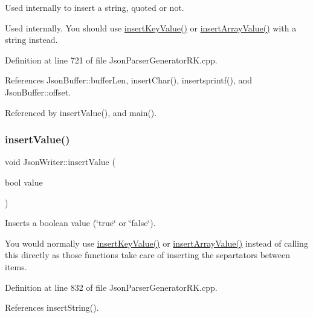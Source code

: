 Used internally to insert a string, quoted or not. 

Used internally. You should use \hyperlink{class_json_writer_ac2de627389b59ce2c8ed95e10ea213bf}{insert\+Key\+Value()} or \hyperlink{class_json_writer_a8b4dc6726b66b4f277c7674e60c8a057}{insert\+Array\+Value()} with a string instead. 

Definition at line 721 of file Json\+Parser\+Generator\+R\+K.\+cpp.



References Json\+Buffer\+::buffer\+Len, insert\+Char(), insertsprintf(), and Json\+Buffer\+::offset.



Referenced by insert\+Value(), and main().

\mbox{\label{class_json_writer_ac58734c238ba7be066838591b0cc7743}} 
\subsubsection{\texorpdfstring{insert\+Value()}{insertValue()}\hspace{0.1cm}{\footnotesize\ttfamily [1/9]}}
{\footnotesize\ttfamily void Json\+Writer\+::insert\+Value (\begin{DoxyParamCaption}\item[{bool}]{value }\end{DoxyParamCaption})}



Inserts a boolean value (\char`\"{}true\char`\"{} or \char`\"{}false\char`\"{}). 

You would normally use \hyperlink{class_json_writer_ac2de627389b59ce2c8ed95e10ea213bf}{insert\+Key\+Value()} or \hyperlink{class_json_writer_a8b4dc6726b66b4f277c7674e60c8a057}{insert\+Array\+Value()} instead of calling this directly as those functions take care of inserting the separtators between items. 

Definition at line 832 of file Json\+Parser\+Generator\+R\+K.\+cpp.



References insert\+String().

\mbox{\label{class_json_writer_a69da120fb595f2820dd73f0c9339e093}} 
